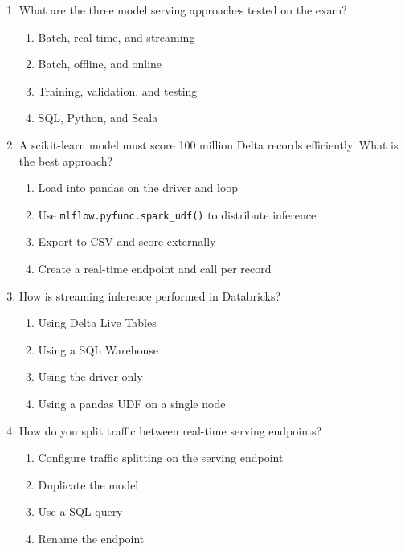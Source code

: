 \documentclass[11pt]{article}
\begin{document}
	\begin{enumerate}[leftmargin=*, label=\textbf{Q\arabic*.}, start=89]
		
		\item What are the three model serving approaches tested on the exam?
		\begin{enumerate}[label=(\alph*)]
			\item Batch, real-time, and streaming
			\item Batch, offline, and online
			\item Training, validation, and testing
			\item SQL, Python, and Scala
		\end{enumerate}
		
		\item A scikit-learn model must score 100 million Delta records efficiently. What is the best approach?
		\begin{enumerate}[label=(\alph*)]
			\item Load into pandas on the driver and loop
			\item Use \texttt{mlflow.pyfunc.spark\_udf()} to distribute inference
			\item Export to CSV and score externally
			\item Create a real-time endpoint and call per record
		\end{enumerate}
		
		\item How is streaming inference performed in Databricks?
		\begin{enumerate}[label=(\alph*)]
			\item Using Delta Live Tables
			\item Using a SQL Warehouse
			\item Using the driver only
			\item Using a pandas UDF on a single node
		\end{enumerate}
		
		\item How do you split traffic between real-time serving endpoints?
		\begin{enumerate}[label=(\alph*)]
			\item Configure traffic splitting on the serving endpoint
			\item Duplicate the model
			\item Use a SQL query
			\item Rename the endpoint
		\end{enumerate}
		

\end{enumerate}
\end{document}
